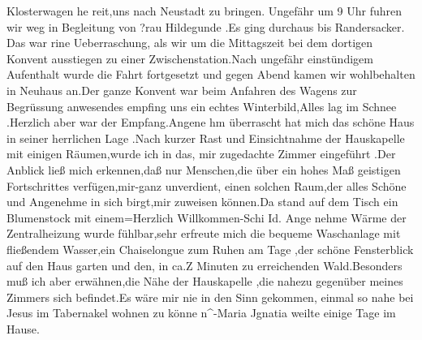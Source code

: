 \documentclass[a4paper,11pt]{article}
\begin{document}
Klosterwagen he reit,uns nach Neustadt zu bringen. Ungefähr um 9 Uhr fuhren wir weg in Begleitung von ?rau Hildegunde .Es ging durchaus bis Randersacker. Das war rine Ueberraschung, als wir um die Mittagszeit bei dem dortigen Konvent ausstiegen zu einer Zwischenstation.Nach ungefähr einstündigem Aufenthalt wurde die Fahrt fortgesetzt und gegen Abend kamen wir wohlbehalten in Neuhaus an.Der ganze Konvent war beim Anfahren des Wagens zur Begrüssung anwesendes empfing uns ein echtes Winterbild,Alles lag im Schnee .Herzlich aber war der Empfang.Angene hm überrascht hat mich das schöne Haus in seiner herrlichen Lage .Nach kurzer Rast und Einsichtnahme der Hauskapelle mit einigen Räumen,wurde ich in das, mir zugedachte Zimmer eingeführt .Der Anblick ließ mich erkennen,daß nur Menschen,die über ein hohes Maß geistigen Fortschrittes verfügen,mir-ganz unverdient, einen solchen Raum,der alles Schöne und Angenehme in sich birgt,mir zuweisen können.Da stand auf dem Tisch ein Blumenstock mit einem=Herzlich Willkommen-Schi Id. Ange nehme Wärme der Zentralheizung wurde fühlbar,sehr erfreute mich die bequeme Waschanlage mit fließendem Wasser,ein Chaiselongue zum Ruhen am Tage ,der schöne Fensterblick auf den Haus garten und den, in ca.Z Minuten zu erreichenden Wald.Besonders muß ich aber erwähnen,die Nähe der Hauskapelle ,die nahezu gegenüber meines Zimmers sich befindet.Es wäre mir nie in den Sinn gekommen, einmal so nahe bei Jesus im Tabernakel wohnen zu könne n^-Maria Jgnatia weilte einige Tage im Hause.
\end{document}
